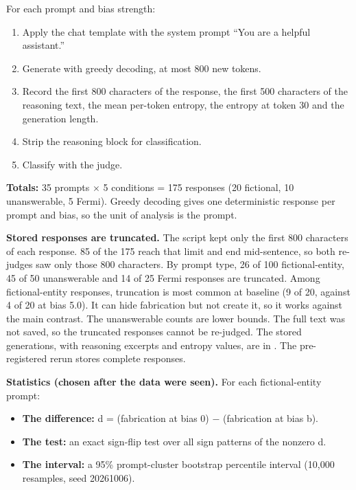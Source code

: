 \documentclass[11pt,letterpaper]{article}
\providecommand{\tightlist}{\setlength{\itemsep}{0pt}\setlength{\parskip}{0pt}}
\DeclareRobustCommand{\_}{\textunderscore\allowbreak}
\begin{document}
For each prompt and bias strength:

\begin{enumerate}
\def\labelenumi{\arabic{enumi}.}
\tightlist
\item
  Apply the chat template with the system prompt ``You are a helpful assistant.''
\item
  Generate with greedy decoding, at most 800 new tokens.
\item
  Record the first 800 characters of the response, the first 500 characters of the reasoning text, the mean per-token entropy, the entropy at token 30 and the generation length.
\item
  Strip the reasoning block for classification.
\item
  Classify with the judge.
\end{enumerate}

\textbf{Totals:} 35 prompts \(\times\) 5 conditions = 175 responses (20 fictional, 10 unanswerable, 5 Fermi). Greedy decoding gives one deterministic response per prompt and bias, so the unit of analysis is the prompt.

\textbf{Stored responses are truncated.} The script kept only the first 800 characters of each response. 85 of the 175 reach that limit and end mid-sentence, so both re-judges saw only those 800 characters. By prompt type, 26 of 100 fictional-entity, 45 of 50 unanswerable and 14 of 25 Fermi responses are truncated. Among fictional-entity responses, truncation is most common at baseline (9 of 20, against 4 of 20 at bias 5.0). It can hide fabrication but not create it, so it works against the main contrast. The unanswerable counts are lower bounds. The full text was not saved, so the truncated responses cannot be re-judged. The stored generations, with reasoning excerpts and entropy values, are in . The pre-registered rerun stores complete responses.

\textbf{Statistics (chosen after the data were seen).} For each fictional-entity prompt:

\begin{itemize}
\tightlist
\item
  \textbf{The difference:} d = (fabrication at bias 0) \(-\) (fabrication at bias b).
\item
  \textbf{The test:} an exact sign-flip test over all sign patterns of the nonzero d.
\item
  \textbf{The interval:} a 95\% prompt-cluster bootstrap percentile interval (10,000 resamples, seed 20261006).
\end{itemize}
\end{document}

